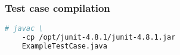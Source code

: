\begin{frame}[fragile, hasprev=false, hasnext=false]
\frametitle{Test case compilation}
\label{example:junit-testcase-compilation}

\begin{lstlisting}[language=bash]
# javac \
	-cp /opt/junit-4.8.1/junit-4.8.1.jar
	ExampleTestCase.java
\end{lstlisting}
\end{frame}
